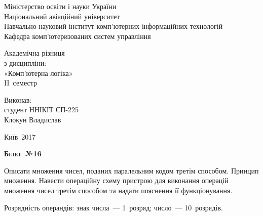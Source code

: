\documentclass[a4paper,oneside,DIV=12,12pt]{scrartcl}
\newcommand{\sheetno}[1]{{\centering\scshape\bfseries Білет~№{#1}\par}}
\begin{document}
	\begin{titlepage}
		\begin{center}
			Міністерство освіти і науки України\\
			Національний авіаційний університет\\
			Навчально-науковий інститут комп'ютерних інформаційних технологій\\
			Кафедра комп'ютеризованих систем управління
			
			\vspace{\fill}
				Академічна різниця\\
				з дисципліни:\\
				«Комп'ютерна логіка»\\
				II~семестр
				
			\vspace{\fill}
			
			\begin{flushright}
				Виконав:\\
				студент ННІКІТ СП-225\\
				Клокун Владислав\\
			\end{flushright}
			Київ~2017
		\end{center}
	\end{titlepage}
	
	\sheetno{16}
	
	\begin{exercise}
		Описати множення чисел, поданих паралельним кодом третім способом. Принцип множення. Навести операційну схему пристрою для виконання операцій множення чисел третім способом та надати пояснення її функціонування.
		
		Розрядність операндів: знак числа~— 1~розряд; число~— 10~розрядів.
	\end{exercise}
	
\end{document}
